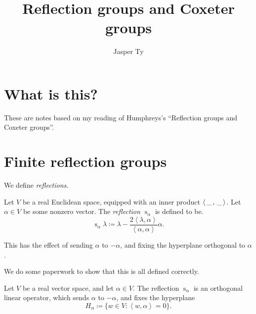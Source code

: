 \documentclass{article}
\title{Reflection groups and Coxeter groups}
\author{Jasper Ty}
\date{}
\newcommand*\wc{{\mkern 3mu\_\mkern 3mu}}
\newcommand{\innerproduct}[2]{\ensuremath{\left\langle #1 , #2 \right\rangle}}
\DeclareMathOperator{\s}{s}
\begin{document}
\maketitle

\section*{What is this?}

These are notes based on my reading of Humphreys's ``Reflection groups and Coxeter groups''.

\tableofcontents

\section{Finite reflection groups}

We define \textit{reflections}.

\begin{definition}
    Let $V$ be a real Euclidean space, equipped with an inner product $\innerproduct{\wc}{\wc}$.
    Let $\alpha \in V$ be some nonzero vector.
    The \textit{reflection $\s_\alpha$} is defined to be.
    \[
        \s_\alpha \lambda \coloneq \lambda - \frac{2\innerproduct{\lambda}{\alpha}}{\innerproduct{\alpha}{\alpha}}\alpha.
    \]
\end{definition}

This has the effect of sending $\alpha$ to $-\alpha$, and fixing the hyperplane orthogonal to $\alpha$.

We do some paperwork to show that this is all defined correctly.

\begin{proposition}
    Let $V$ be a real vector space, and let $\alpha \in V$.
    The reflection $\s_\alpha$ is an orthogonal linear operator, which sends $\alpha$ to $-\alpha$, and fixes the hyperplane
    \[
        H_\alpha \coloneq \{w \in V: \innerproduct{w}{\alpha} = 0\}.
    \]
\end{proposition}
\end{document}
